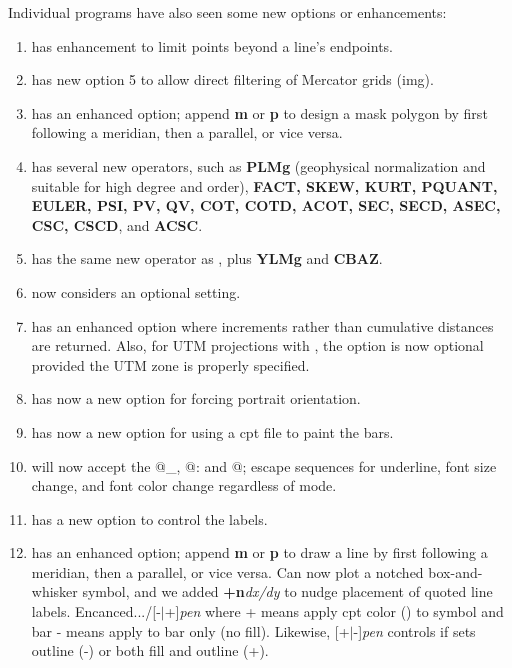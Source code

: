 Individual programs have also seen some new options or enhancements:
\begin{enumerate}
\item {} has enhancement  to limit points beyond a line's endpoints.
\item {} has new option 5 to allow direct filtering of Mercator grids (img).
\item {} has an enhanced  option; append \textbf{m} or \textbf{p} to design
a mask polygon by first following a meridian, then a parallel, or vice versa.
\item {} has several new operators, such as \textbf{PLMg} (geophysical normalization
and suitable for high degree and order), \textbf{FACT, SKEW, KURT, PQUANT, EULER, PSI, PV, QV, COT,
COTD, ACOT, SEC, SECD, ASEC, CSC, CSCD}, and \textbf{ACSC}.
\item {} has the same new operator as , plus \textbf{YLMg} and \textbf{CBAZ}.
\item {} now considers  an optional setting.
\item {} has an enhanced  option where increments rather than 
cumulative distances are returned.  Also, for UTM projections with , the 
option is now optional provided the UTM zone is properly specified.
\item {} has now a new  option for forcing portrait orientation.
\item {} has now a new  option for using a cpt file to paint the bars.
\item {} will now accept the @\_, @: and @; escape sequences for underline,
font size change, and font color change regardless of mode.
\item {} has a new option  to control the labels.
\item {} has an enhanced  option; append \textbf{m} or \textbf{p} to draw a
line by first following a meridian, then a parallel, or vice versa. Can now plot a notched
box-and-whisker symbol, and we added \textbf{+n}\emph{dx/dy} to nudge placement of quoted line labels.
Encanced.../[-$|$+]\emph{pen} where + means apply cpt color () to symbol and bar
- means apply to bar only (no fill).  Likewise, [+$|$-]\emph{pen} controls
if  sets outline (-) or both fill and outline (+).

\end{enumerate}
